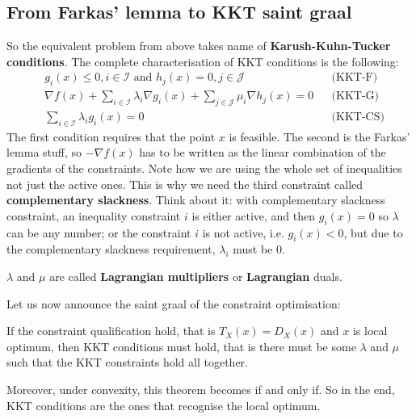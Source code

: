 \subsection{From Farkas' lemma to KKT saint graal}
\par So the equivalent problem from above takes name of \textbf{Karush-Kuhn-Tucker conditions}. The complete characterisation of KKT conditions is the following:
\begin{align}
    &g_i(x) \leq 0, i \in \mathcal{I} \mbox{ and } h_j(x) = 0, j \in \mathcal{J} && \mbox{(KKT-F)}\\
    &\nabla f(x) + \sum_{i \in \mathcal{I}} \lambda_i \nabla g_i(x) + \sum_{j \in \mathcal{J}} \mu_i \nabla h_j(x) = 0 && \mbox{(KKT-G)}\\
    &\sum_{i \in \mathcal{I}} \lambda_i g_i(x) = 0 && \mbox{(KKT-CS)}
\end{align}
The first condition requires that the point $x$ is feasible. The second is the Farkas' lemma stuff, so $-\nabla f(x)$ has to be written as the linear combination of the gradients of the constraints. Note how we are using the whole set of inequalities not just the active ones. This is why we need the third constraint called \textbf{complementary slackness}. Think about it: with complementary slackness constraint, an inequality constraint $i$ is either active, and then $g_i(x) = 0$ so $\lambda$ can be any number; or the constraint $i$ is not active, i.e. $g_i(x) < 0$, but due to the complementary slackness requirement, $\lambda_i$ must be 0.
\par $\lambda$ and $\mu$ are called \textbf{Lagrangian multipliers} or \textbf{Lagrangian} duals.
\par Let us now announce the saint graal of the constraint optimisation:
\begin{theorem}
    If the constraint qualification hold, that is $T_X(x) = D_X(x)$ and $x$ is local optimum, then KKT conditions must hold, that is there must be some $\lambda$ and $\mu$ such that the KKT constraints hold all together.
\end{theorem}
Moreover, under convexity, this theorem becomes if and only if. So in the end, KKT conditions are the ones that recognise the local optimum.
%
